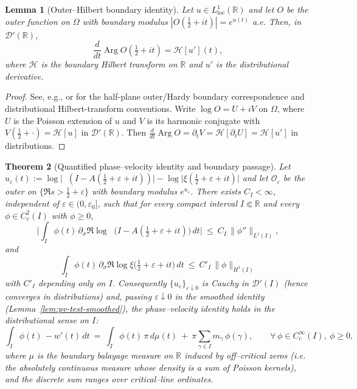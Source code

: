 \documentclass[11pt]{article}
\newcommand{\Hilb}{\mathcal H}
\newtheorem{theorem}{Theorem}
\newtheorem{lemma}[theorem]{Lemma}
\theoremstyle{definition}
\theoremstyle{remark}
\theoremstyle{definition}
\newcommand{\R}{\mathbb{R}}
\DeclareMathOperator{\dettwo}{det_2}
\DeclareMathOperator{\Arg}{Arg}
\begin{document}
\begin{lemma}[Outer–Hilbert boundary identity]\label{lem:outer-phase-HT}
Let $u\in L^1_{\mathrm{loc}}(\mathbb R)$ and let $O$ be the outer function on $\Omega$ with boundary modulus $|O(\tfrac12+it)|=e^{u(t)}$ a.e. Then, in $\mathcal D'(\mathbb R)$,
\[
\frac{d}{dt}\Arg O\!\left(\tfrac12+it\right)=\Hilb[u'](t),
\]
where $\Hilb$ is the boundary Hilbert transform on $\mathbb R$ and $u'$ is the distributional derivative.
\end{lemma}
\begin{proof}
See, e.g., \cite[Ch.~2]{DurenHp} or \cite[Ch.~2]{RosenblumRovnyak} for the half-plane outer/Hardy boundary correspondence and distributional Hilbert-transform conventions.
Write $\log O=U+iV$ on $\Omega$, where $U$ is the Poisson extension of $u$ and $V$ is its harmonic conjugate with $V(\tfrac12+\cdot)=\Hilb[u]$ in $\mathcal D'(\mathbb R)$. Then $\tfrac{d}{dt}\Arg O=\partial_t V=\Hilb[\partial_t U]=\Hilb[u']$ in distributions.
\end{proof}
\begin{theorem}[Quantified phase–velocity identity and boundary passage]\label{thm:phase-velocity-quant}
Let $u_\varepsilon(t):=\log\big|\dettwo(I-A(\tfrac12+\varepsilon+it))\big| - \log\big|\xi(\tfrac12+\varepsilon+it)\big|$ and let $\mathcal O_\varepsilon$ be the outer on $\{\Re s>\tfrac12+\varepsilon\}$ with boundary modulus $e^{u_\varepsilon}$. There exists $C_I<\infty$, independent of $\varepsilon\in(0,\varepsilon_0]$, such that for every compact interval $I\Subset\R$ and every $\phi\in C_c^2(I)$ with $\phi\ge 0$,
\[
 \Big|\int_I \phi(t)\,\partial_\sigma\Re\log\dettwo\big(I-A(\tfrac12+\varepsilon+it)\big)\,dt\Big|\ \le\ C_I\,\|\phi''\|_{L^1(I)},
\]
and
\[
 \int_I \phi(t)\,\partial_\sigma\Re\log\xi\big(\tfrac12+\varepsilon+it\big)\,dt\ \le\ C'_I\,\|\phi\|_{H^1(I)}
\]
with $C'_I$ depending only on $I$. Consequently $\{u_\varepsilon\}_{\varepsilon\downarrow 0}$ is Cauchy in $\mathcal D'(I)$ (hence converges in distributions) and, passing $\varepsilon\downarrow 0$ in the smoothed identity (Lemma~\ref{lem:pv-test-smoothed}), the phase–velocity identity holds in the distributional sense on $I$:
\[
 \int_I \phi(t)\,-w'(t)\,dt\ =\ \int_I \phi(t)\,\pi\,d\mu(t)\ +\ \pi\sum_{\gamma\in I} m_\gamma\,\phi(\gamma),\qquad \forall\,\phi\in C_c^\infty(I),\ \phi\ge 0,
\]
where $\mu$ is the \emph{boundary balayage measure} on $\mathbb R$ induced by off–critical zeros (i.e. the absolutely continuous measure whose density is a sum of Poisson kernels), and the discrete sum ranges over critical–line ordinates.
\end{theorem}
\end{document}
